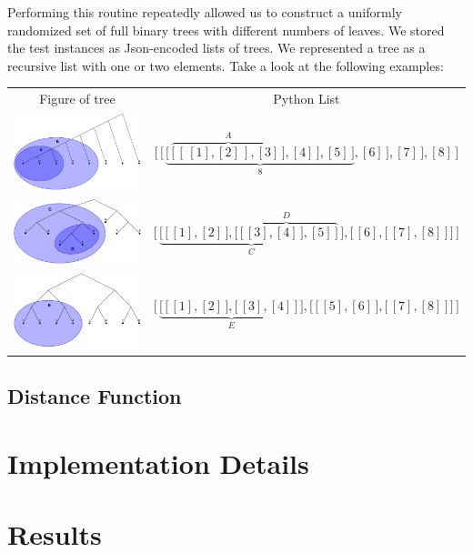 Performing this routine repeatedly allowed us to construct a uniformly randomized set of full binary trees with different numbers of leaves. We stored the test instances as Json-encoded lists of trees. We represented a tree as a recursive list with one or two elements. Take a look at the following examples:

\begin{table}[h!]
	\centering
	\begin{tabular}{c | c} 
 		Figure of tree & Python List \\
		\cmidrule(r){1-1}\cmidrule(l){2-2}
		{\includegraphics[width=.4\textwidth, margin=0pt 0pt 0pt 1ex,valign=m]{figures/python_tree_example_1.png}}
		& $\Bigg[ \, \bigg[ \, \underbrace{\Big[ \, \overbrace{\big[ \, [ \, [ 1 ], [ 2 ] \, ], [ 3 ] \, \big]}^{A}, [ 4 ] \, ], [ 5 ] \, \Big]}_{8}, [ 6 ] \, ], [ 7 ] \, \bigg], [ 8 ] \, \Bigg] $\\
		\cmidrule(r){1-1}\cmidrule(l){2-2} 
		{\includegraphics[width=.4\textwidth, margin=0pt 0pt 0pt 1ex,valign=m]{figures/python_tree_example_2.png}}
		& $\Bigg[ \, \underbrace{\bigg[ \, \Big[ \, [ 1 ], [ 2 ] \, \Big], \overbrace{\Big[ \, \big[ \, [ 3 ], [ 4 ] \, \big], [ 5 ] \, \Big]}^{D} \, \bigg]}_{C}, \bigg[ \, [ 6 ], \Big[ \, [ 7 ], [ 8 ] \, \Big]  \, \bigg] \, \Bigg]$\\
		\cmidrule(r){1-1}\cmidrule(l){2-2} 
		{\includegraphics[width=.4\textwidth, margin=0pt 0pt 0pt 1ex,valign=m]{figures/python_tree_example_3.png}}
		& $\Bigg[ \, \underbrace{\bigg[ \, \Big[ \, [ 1 ], [ 2 ] \, \Big], \Big[ \, [ 3 ], [ 4 ] \, \Big] \, \bigg]}_{E}, \bigg[ \, \Big[ \, [ 5 ], [ 6 ] \, \Big], \Big[ \, [ 7 ], [ 8 ] \, \Big] \, \bigg] \, \Bigg]$\\
		
	\end{tabular}
\end{table}

\subsection{Distance Function}


\section{Implementation Details}
\section{Results}
